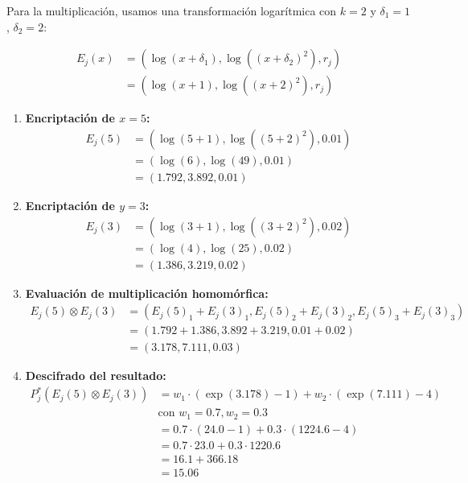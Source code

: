 \documentclass[11pt]{article}
\theoremstyle{plain}
\begin{document}
Para la multiplicación, usamos una transformación logarítmica con $k=2$ y $\delta_1 = 1$, $\delta_2 = 2$:

\begin{align}
E_j(x) &= (\log(x + \delta_1), \log((x + \delta_2)^2), r_j)\\
&= (\log(x + 1), \log((x + 2)^2), r_j)
\end{align}

\begin{enumerate}
    \item \textbf{Encriptación de $x=5$:}
    \begin{align}
    E_j(5) &= (\log(5 + 1), \log((5 + 2)^2), 0.01)\\
    &= (\log(6), \log(49), 0.01)\\
    &= (1.792, 3.892, 0.01)
    \end{align}

    \item \textbf{Encriptación de $y=3$:}
    \begin{align}
    E_j(3) &= (\log(3 + 1), \log((3 + 2)^2), 0.02)\\
    &= (\log(4), \log(25), 0.02)\\
    &= (1.386, 3.219, 0.02)
    \end{align}

    \item \textbf{Evaluación de multiplicación homomórfica:}
    \begin{align}
    E_j(5) \otimes E_j(3) &= (E_j(5)_1 + E_j(3)_1, E_j(5)_2 + E_j(3)_2, E_j(5)_3 + E_j(3)_3)\\
    &= (1.792 + 1.386, 3.892 + 3.219, 0.01 + 0.02)\\
    &= (3.178, 7.111, 0.03)
    \end{align}

    \item \textbf{Descifrado del resultado:}
    \begin{align}
    P^*_j(E_j(5) \otimes E_j(3)) &= w_1 \cdot (\exp(3.178) - 1) + w_2 \cdot (\exp(7.111) - 4)\\
    &\text{con } w_1 = 0.7, w_2 = 0.3\\
    &= 0.7 \cdot (24.0 - 1) + 0.3 \cdot (1224.6 - 4)\\
    &= 0.7 \cdot 23.0 + 0.3 \cdot 1220.6\\
    &= 16.1 + 366.18\\
    &= 15.06
    \end{align}
\end{enumerate}
\end{document}
